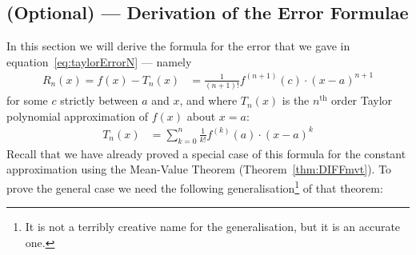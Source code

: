 \subsection{(Optional) --- Derivation of the Error Formulae}\label{subsec:GMVT}
In this section we will derive the formula for the error that we gave in
equation~\eqref{eq:taylorErrorN} --- namely
\begin{align*}
  R_n(x) = f(x) - T_n(x) &= \frac{1}{(n+1)!}f^{(n+1)}(c)\cdot (x-a)^{n+1}
\end{align*}
for some $c$ strictly between $a$ and $x$, and where $T_n(x)$ is the $n^\mathrm{th}$
order Taylor polynomial approximation of $f(x)$ about $x=a$:
\begin{align*}
  T_n(x) &= \sum_{k=0}^n \frac{1}{k!} f^{(k)}(a)\cdot (x-a)^k
\end{align*}
Recall that we have already proved a special case of this formula for the constant
approximation using the Mean-Value Theorem (Theorem~\ref{thm:DIFFmvt}). To prove the
general case we need the following generalisation\footnote{It is not a terribly creative
name for the generalisation, but it is an accurate one.} of that theorem:

